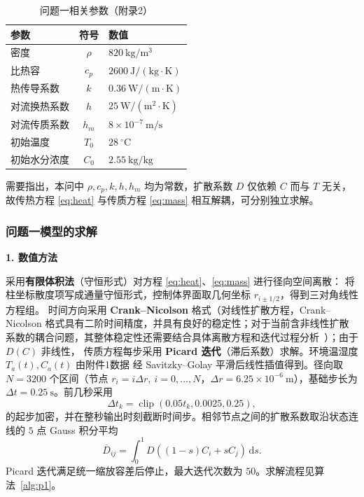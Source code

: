 \documentclass[12pt,a4paper]{ctexart}
\begin{document}
\begin{table}[H]
\centering
\begin{tabular}{lcl}
\toprule
参数 & 符号 & 数值 \\
\midrule
密度 & $\rho$ & $820\ \mathrm{kg/m^3}$ \\
比热容 & $c_p$ & $2600\ \mathrm{J/(kg\cdot K)}$ \\
热传导系数 & $k$ & $0.36\ \mathrm{W/(m\cdot K)}$ \\
对流换热系数 & $h$ & $25\ \mathrm{W/(m^2\cdot K)}$ \\
对流传质系数 & $h_m$ & $8\times10^{-7}\ \mathrm{m/s}$ \\
初始温度 & $T_0$ & $28\ ^\circ\mathrm{C}$ \\
初始水分浓度 & $C_0$ & $2.55\ \mathrm{kg/kg}$ \\
\bottomrule
\end{tabular}
\caption{问题一相关参数（附录2）}
\label{tab:param}
\end{table}

需要指出，本问中 $\rho,c_p,k,h,h_m$ 均为常数，扩散系数 $D$ 仅依赖 $C$ 而与 $T$ 无关，
故传热方程 \eqref{eq:heat} 与传质方程 \eqref{eq:mass} 相互解耦，可分别独立求解。

\subsubsection{问题一模型的求解}
\textbf{1. 数值方法}

采用\textbf{有限体积法}（守恒形式）对方程 \eqref{eq:heat}、\eqref{eq:mass} 进行径向空间离散：
将柱坐标散度项写成通量守恒形式，控制体界面取几何坐标 $r_{i\pm1/2}$，得到三对角线性方程组。
时间方向采用 \textbf{Crank--Nicolson} 格式（对线性扩散方程，Crank–Nicolson 格式具有二阶时间精度，并具有良好的稳定性；对于当前含非线性扩散系数的耦合问题，其整体稳定性还需要结合具体离散方程和迭代过程分析~\cite{ref4}）；由于 $D(C)$ 非线性，
传质方程每步采用 \textbf{Picard 迭代}（滞后系数）求解。环境温湿度 $T_a(t),C_a(t)$ 由附件1数据
经 Savitzky--Golay 平滑后线性插值得到。径向取 $N=3200$ 个区间（节点 $r_i=i\Delta r,\ i=0,\dots,N$，$\Delta r=6.25\times10^{-6}\ \mathrm{m}$），基础步长为 $\Delta t=0.25\ \mathrm{s}$。前几秒采用
\begin{equation}
\Delta t_k=\operatorname{clip}(0.05t_k,0.0025,0.25),
\label{eq:p1startup}
\end{equation}
的起步加密，并在整秒输出时刻截断时间步。相邻节点之间的扩散系数取沿状态连线的 $5$ 点 Gauss 积分平均
\begin{equation}
\overline D_{ij}=\int_0^1D\!\left((1-s)C_i+sC_j\right)\,\mathrm ds.
\label{eq:p1facemean}
\end{equation}
Picard 迭代满足统一缩放容差后停止，最大迭代次数为 $50$。求解流程见算法~\ref{alg:p1}。
\end{document}
